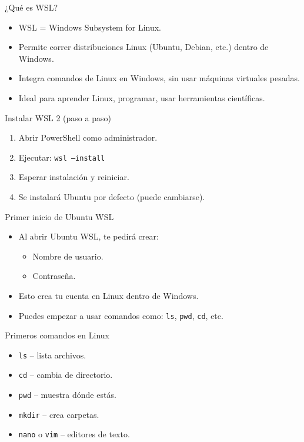 \documentclass[aspectratio=169,professionalfonts]{beamer}
\begin{document}
\begin{frame}{¿Qué es WSL?}
  \begin{itemize}
    \item WSL = Windows Subsystem for Linux.
    \item Permite correr distribuciones Linux (Ubuntu, Debian, etc.) dentro de Windows.
    \item Integra comandos de Linux en Windows, sin usar máquinas virtuales pesadas.
    \item Ideal para aprender Linux, programar, usar herramientas científicas.
  \end{itemize}
\end{frame}

\begin{frame}{Instalar WSL 2 (paso a paso)}
  \begin{enumerate}
    \item Abrir PowerShell como administrador.
    \item Ejecutar: \texttt{wsl --install}
    \item Esperar instalación y reiniciar.
    \item Se instalará Ubuntu por defecto (puede cambiarse).
  \end{enumerate}
\end{frame}

\begin{frame}{Primer inicio de Ubuntu WSL}
  \begin{itemize}
    \item Al abrir Ubuntu WSL, te pedirá crear:
      \begin{itemize}
        \item Nombre de usuario.
        \item Contraseña.
      \end{itemize}
    \item Esto crea tu cuenta en Linux dentro de Windows.
    \item Puedes empezar a usar comandos como: \texttt{ls}, \texttt{pwd}, \texttt{cd}, etc.
  \end{itemize}
\end{frame}


\begin{frame}{Primeros comandos en Linux}
  \begin{itemize}
    \item \texttt{ls} -- lista archivos.
    \item \texttt{cd} -- cambia de directorio.
    \item \texttt{pwd} -- muestra dónde estás.
    \item \texttt{mkdir} -- crea carpetas.
    \item \texttt{nano} o \texttt{vim} -- editores de texto.
  \end{itemize}
\end{frame}
\end{document}

